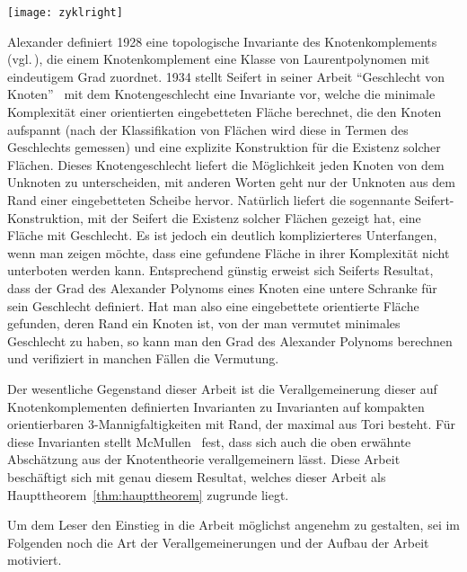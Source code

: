 	\hfill
	\begin{minipage}[t]{0.2\textwidth}
	\vfill \begin{flushright}
		\texttt{[image: zyklright]} 
	\end{flushright}
	\end{minipage}

	Alexander definiert 1928 eine topologische Invariante des Knotenkomplements (vgl.\,\cite{Alexander.1928}), die einem Knotenkomplement eine Klasse von Laurentpolynomen mit eindeutigem Grad zuordnet. 1934 stellt Seifert in seiner Arbeit "`Geschlecht von Knoten"'~\cite{Seifert.1934} mit dem Knotengeschlecht eine Invariante vor, welche die minimale Komplexität einer orientierten eingebetteten Fläche berechnet, die den Knoten aufspannt (nach der Klassifikation von Flächen wird diese in Termen des Geschlechts gemessen) und eine explizite Konstruktion für die Existenz solcher Flächen. Dieses Knotengeschlecht liefert die Möglichkeit jeden Knoten von dem Unknoten zu unterscheiden, mit anderen Worten geht nur der Unknoten aus dem Rand einer eingebetteten Scheibe hervor. Natürlich liefert die sogennante Seifert-Konstruktion, mit der Seifert die Existenz solcher Flächen gezeigt hat, eine Fläche mit Geschlecht. Es ist jedoch ein deutlich komplizierteres Unterfangen, wenn man zeigen möchte, dass eine gefundene Fläche in ihrer Komplexität nicht unterboten werden kann. Entsprechend günstig erweist sich Seiferts Resultat, dass der Grad des Alexander Polynoms eines Knoten eine untere Schranke für sein Geschlecht definiert. Hat man also eine eingebettete orientierte Fläche gefunden, deren Rand ein Knoten ist, von der man vermutet minimales Geschlecht zu haben, so kann man den Grad des Alexander Polynoms berechnen und verifiziert in manchen Fällen die Vermutung.

	Der wesentliche Gegenstand dieser Arbeit ist die Verallgemeinerung dieser auf Knotenkomplementen definierten Invarianten zu Invarianten auf kompakten orientierbaren 3-Mannigfaltigkeiten mit Rand, der maximal aus Tori besteht. Für diese Invarianten stellt McMullen~\cite{MCMULLEN.2002} fest, dass sich auch die oben erwähnte Abschätzung aus der Knotentheorie verallgemeinern lässt. Diese Arbeit beschäftigt sich mit genau diesem Resultat, welches dieser Arbeit als Haupttheorem~\ref{thm:haupttheorem} zugrunde liegt.

	Um dem Leser den Einstieg in die Arbeit möglichst angenehm zu gestalten, sei im Folgenden noch die Art der Verallgemeinerungen und der Aufbau der Arbeit motiviert.

